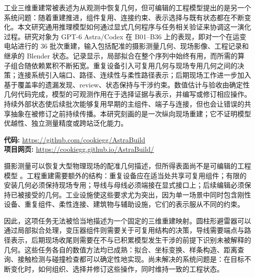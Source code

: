 \documentclass[10pt,a4paper]{article}
\begin{document}
\vspace{0.9em}

\vspace{0.15em}
\vspace{0.15em}
\vspace{1.0em}

{\small 工业三维重建常被表述为从观测中恢复几何，但可编辑的工程模型提出的是另一个系统问题：随着重建推进，组件复用、连接约束、表示选择与既有状态都在不断变化。本文研究通用推理模型如何通过显式几何程序与任务相关验证来协调这一演化过程。研究对象为
GPT-6 Astra/Codex 在 B01--B36 上的表现，即对一个在运变电站进行的 36
批次重建，输入包括配准的摄影测量几何、现场影像、工程记录和继承的 Blender
状态。记录显示，局部拟合在整个序列中始终有用，而所需的算子组合随依赖累积不断拓宽。重复设备引入可复用几何与现场专用几何之间的决策；连接系统引入端口、路径、连续性与柔性路径表示；后期现场工作进一步加入基于覆盖率的遗漏发现、review、状态保持与干涉约束。数值估计与验收由确定性几何代码完成，模型的可观测作用在于选择证据与表示，并编写或修订相应操作。持续外部状态使后续批次能够复用早期的主组件、端子与连接，但也会让错误的共享抽象在被修订之前持续传播。本研究刻画的是一次纵向现场重建；它不证明模型优越性、独立测量精度或跨站泛化能力。\par}
\vspace{0.8em}

\noindent\colorbox{black!6}{\parbox{\dimexpr\linewidth-2\fboxsep\relax}{\small\textbf{代码:} \url{https://github.com/cookiegg/AstraBuild}\\[2pt]\textbf{项目网页:} \url{https://cookiegg.github.io/AstraBuild/}}}
\vspace{0.8em}

摄影测量可以恢复大型物理现场的配准几何描述，但所得表面尚不是可编辑的工程模型
\citep{schonberger2016sfm}。工程重建需要额外的结构：重复设备应在适当处共享可复用组件；有限的安装几何必须保持现场专用；导线与母线必须端接在显式接口上；后续编辑必须保持已被接受的几何。工业设施使这些要求尤为突出，因为单一场景中同时包含刚性设备、重复组件、柔性连接、建筑物与辅助设施，它们的表示服从不同的约束。

因此，这项任务无法被恰当地描述为一个固定的三维重建映射。圆柱形避雷器可以通过局部拟合处理，变压器组件则需要关于可复用结构的决策，导线需要端点与路径表示，后期现场收尾则需要在不与已积累模型发生干涉的前提下识别未被解释的几何。这些任务各自的数值方法均已成熟：拟合、坐标变换、样条构造、距离查询、接触检测与碰撞检查都可以确定性地实现。尚未解决的系统问题是：在目标不断变化时，如何组织、选择并修订这些操作，同时维持一致的工程状态。
\end{document}
